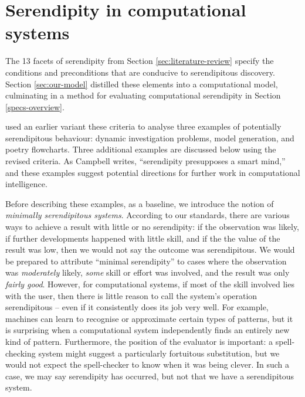 \section{Serendipity in computational systems} \label{sec:computational-serendipity}

The 13 facets of serendipity from Section \ref{sec:literature-review} specify the
conditions and preconditions that are conducive to serendipitous
discovery.  Section \ref{sec:our-model} distilled these elements into a computational model,
culminating in a method for evaluating computational serendipity in Section \ref{specs-overview}.

 used an earlier variant these criteria to
analyse three examples of potentially serendipitous behaviour: dynamic
investigation problems, model generation, and poetry flowcharts.
Three additional examples are discussed below using the revised
criteria.  As Campbell \citeyear{campbell2005serendipity} writes,
``serendipity presupposes a smart mind,'' and these examples suggest
potential directions for further work in computational intelligence.

Before describing these examples, as a baseline, we introduce the
notion of \emph{minimally serendipitous systems}.  According to our
standards, there are various ways to achieve a result with little or
no serendipity: if the observation was likely, if further developments
happened with little skill, and if the the value of the result was
low, then we would not say the outcome was serendipitous.  We would be
prepared to attribute ``minimal serendipity'' to cases where the
observation was \emph{moderately} likely, \emph{some} skill or effort
was involved, and the result was only \emph{fairly good}.  However,
for computational systems, if most of the skill involved lies with the
user, then there is little reason to call the system's operation
serendipitous -- even if it consistently does its job very well.  For
example, machines can learn to recognise or approximate certain types
of patterns, but it is surprising when a computational system
independently finds an entirely new kind of pattern.  Furthermore, the
position of the evaluator is important: a spell-checking system might
suggest a particularly fortuitous substitution, but we would not
expect the spell-checker to know when it was being clever.  In such a
case, we may say serendipity has occurred, but not that we have a
serendipitous system.

